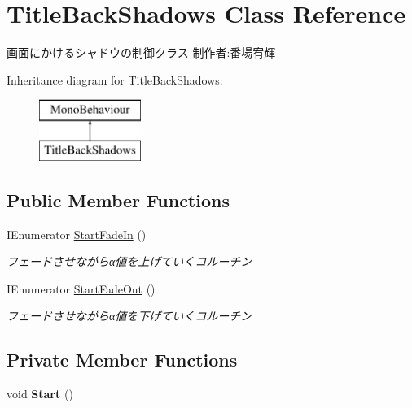 \hypertarget{class_title_back_shadows}{}\section{Title\+Back\+Shadows Class Reference}
\label{class_title_back_shadows}


画面にかけるシャドウの制御クラス 制作者\+:番場宥輝  


Inheritance diagram for Title\+Back\+Shadows\+:\begin{figure}[H]
\begin{center}
\leavevmode
\includegraphics[height=2.000000cm]{class_title_back_shadows}
\end{center}
\end{figure}
\subsection*{Public Member Functions}
\begin{DoxyCompactItemize}
\item 
I\+Enumerator \hyperlink{class_title_back_shadows_a88368f9e482c132413ff1c83614cea63}{Start\+Fade\+In} ()
\begin{DoxyCompactList}\small\item\em フェードさせながらα値を上げていくコルーチン \end{DoxyCompactList}\item 
I\+Enumerator \hyperlink{class_title_back_shadows_a124892396b8224c12ee18bc7548a7320}{Start\+Fade\+Out} ()
\begin{DoxyCompactList}\small\item\em フェードさせながらα値を下げていくコルーチン \end{DoxyCompactList}\end{DoxyCompactItemize}
\subsection*{Private Member Functions}
\begin{DoxyCompactItemize}
\item 
\mbox{\label{class_title_back_shadows_a315840aede5ae55ea950e2598a15375c}} 
void {\bfseries Start} ()
\end{DoxyCompactItemize}
